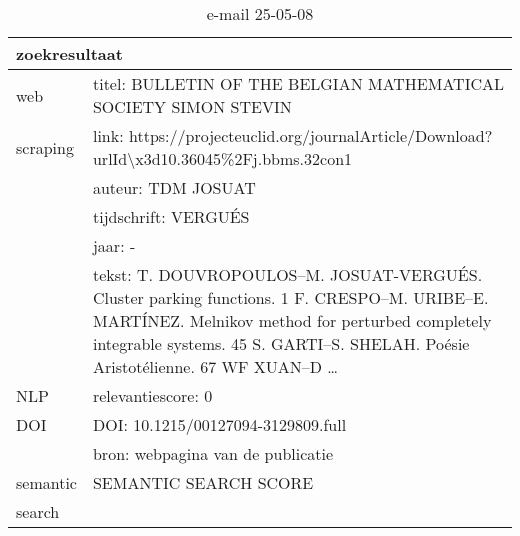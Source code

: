 \begin{table}[h!]
    \caption{e-mail 25-05-08}
    \centering
    \begin{tabularx}{\textwidth}{|p{4cm}|X|} 
        \hline
        \multicolumn{2}{|X|}{\textbf{zoekresultaat}} \\
        \hline
        web &titel: BULLETIN OF THE BELGIAN MATHEMATICAL SOCIETY SIMON STEVIN\\
        scraping&link: https://projecteuclid.org/journalArticle/Download?urlId\textbackslash x3d10.36045\%2Fj.bbms.32con1\\
        &auteur: TDM JOSUAT\\
        &tijdschrift: VERGUÉS\\
        &jaar: -\\
        &tekst: T. DOUVROPOULOS–M. JOSUAT-VERGUÉS. Cluster parking functions. 1 F. CRESPO–M. URIBE–E. MARTÍNEZ. Melnikov method for perturbed completely integrable systems. 45 S. GARTI–S. SHELAH. Poésie Aristotélienne. 67 WF XUAN–D …\\
        \hline
        NLP&relevantiescore: 0\\
        \hline
        DOI&DOI: 10.1215/00127094-3129809.full\\
        &bron: webpagina van de publicatie\\
        \hline
        semantic&SEMANTIC SEARCH SCORE\\
        search&\\
        \hline
    \end{tabularx}
    \label{table:email20250508}
\end{table}

